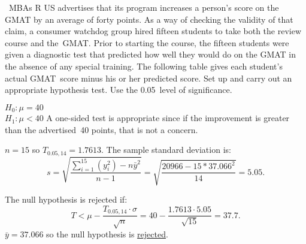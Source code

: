 \begin{problem}
  ~MBAs R US advertises that its program increases a person's score on the GMAT by an average of forty points.  As a way of checking the validity of that claim, a consumer watchdog group hired fifteen students to take both the review course and the~GMAT\@.  Prior to starting the course, the fifteen students were given a diagnostic test that predicted how well they would do on the GMAT in the absence of any special training.  The following table gives each student's actual GMAT~score minus his or her predicted score.  Set up and carry out an appropriate hypothesis test.  Use the 0.05~level of significance.
\end{problem}

\noindent
$H_0: \mu = 40$\\
$H_1: \mu < 40$  A one-sided test is appropriate since if the improvement is greater than the advertised~40 points, that is not a concern.

${n = 15}$ so ${T_{0.05,14} = 1.7613}$.  The sample standard deviation is:
\begin{equation}
  s = \sqrt{\frac{\sum_{i=1}^{15} \left(y_{i}^2\right) - n \bar{y}^2}{n-1}} = \sqrt{\frac{20966 - 15 * 37.066^2}{14}} = 5.05\text{.}
\end{equation}

The null hypothesis is rejected if:
\begin{equation}
  T < \mu - \frac{T_{0.05,14} \cdot \sigma}{\sqrt{n}} = 40 - \frac{1.7613 \cdot 5.05}{\sqrt{15}} = 37.7\text{.}
\end{equation}
${\bar{y} = 37.066}$ so the null hypothesis is \underline{rejected}.
